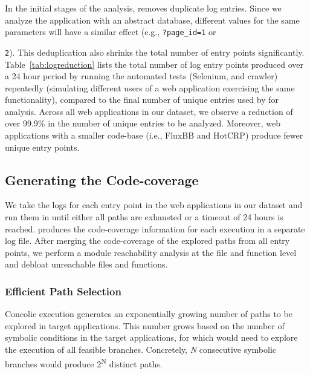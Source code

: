 In the initial stages of the analysis, \animatedead{} removes duplicate log entries. 
Since we analyze the application with an abstract database, different values for the same parameters will have a similar effect (e.g., \texttt{?page\_id=1} or {\texttt{2}). 
This deduplication also shrinks the total number of entry points significantly. 
Table~\ref{tab:logreduction} lists the total number of log entry points produced over a 24 hour period by running the automated tests (Selenium, and crawler) repeatedly (simulating different users of a web application exercising the same functionality), compared to the final number of unique entries used by \animatedead{} for analysis. 
Across all web applications in our dataset, we observe a reduction of over 99.9\% in the number of unique entries to be analyzed. 
Moreover, web applications with a smaller code-base (i.e., FluxBB and HotCRP) produce fewer unique entry points. 

\subsection{Generating the Code-coverage}

We take the logs for each entry point in the web applications in our dataset and run them in \animatedead{} until either all paths are exhausted or a timeout of 24 hours is reached. 
\animatedead{} produces the code-coverage information for each execution in a separate log file. 
After merging the code-coverage of the explored paths from all entry points, we perform a module reachability analysis at the file and function level and debloat unreachable files and functions. 

\subsubsection{Efficient Path Selection}
\label{sec:path_priority}
Concolic execution generates an exponentially growing number of paths to be explored in target applications. 
This number grows based on the number of symbolic conditions in the target applications, for which \animatedead{} would need to explore the execution of all feasible branches. 
Concretely, \emph{N} consecutive symbolic branches would produce 2\textsuperscript{N} distinct paths. 

}
